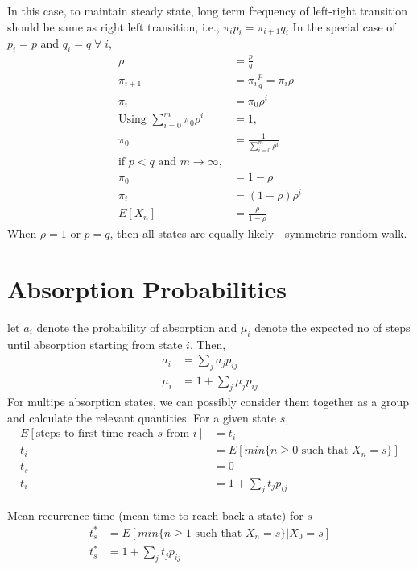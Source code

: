 \documentclass[../probability-notes.tex]{subfiles}
\begin{document}
    In this case, to maintain steady state, long term frequency of left-right transition should be same as right left transition, i.e., $\pi_{i}p_{i} = \pi_{i+1}q_{i}$ \newline
    In the special case of $p_{i} = p$ and $q_{i} = q \;\forall\; i$,
    \begin{align*}
        \rho &= \frac{p}{q} \tag*{load factor}\\
        \pi_{i+1} &= \pi_{i} \frac{p}{q} = \pi_{i} \rho \\
        \pi_{i} &= \pi_{0} \rho^{i} \tag*{$i = 0,\ldots,m$} \\
        \text{Using } \sum_{i=0}^{m} \pi_{0}\rho^{i} &= 1,\\
        \pi_{0} &= \frac{1}{\sum_{i=0}^{m} \rho^{i}}\\
        \text{if $p < q$ and $m \rightarrow \infty,$}\\
        \pi_{0} &= 1 - \rho \\
        \pi_{i} &= (1-\rho)\rho^{i}\\
        E[X_{n}] &= \frac{\rho}{1-\rho} \tag*{Exponential Distribution}
    \end{align*}
    When $\rho = 1$ or $p = q$, then all states are equally likely - symmetric random walk.

    \section{Absorption Probabilities}
    \label{sec_markov_absorb}
    let $a_{i}$ denote the probability of absorption and $\mu_{i}$ denote the expected no of steps until absorption starting from state $i$. Then,
    \begin{align*}
        a_{i} &= \sum_{j} a_{j}p_{ij} \tag*{outflux to the possible states}\\
        \mu_{i} &= 1 + \sum_{j} \mu_{j} p_{ij}
    \end{align*}
    For multipe absorption states, we can possibly consider them together as a group and calculate the relevant quantities. \newline
    For a given state $s$,
    \begin{align*}
        E[\text{steps to first time reach $s$ from $i$}] &= t_{i} \\
        t_{i} &= E[min \{n \geq 0 \text{ such that } X_{n} = s\}] \\
        t_{s} &= 0 \\
        t_{i} &= 1 + \sum_{j} t_{j}p_{ij} \tag*{outflux to all possible states}
    \end{align*}

    Mean recurrence time (mean time to reach back a state) for $s$
    \begin{align*}
        t_{s}^{*} &= E[min\{n \geq 1 \text{ such that } X_{n}=s\} | X_{0} = s] \\
        t_{s}^{*} &= 1 + \sum_{j} t_{j} p_{ij}
    \end{align*}
\end{document}
